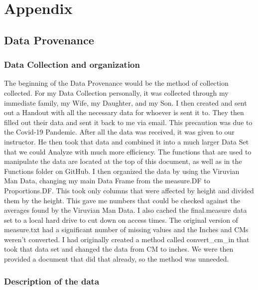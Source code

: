 \documentclass[]{article}
\begin{document}
\section{Appendix}
\subsection{Data Provenance}
\subsubsection{Data Collection and organization}

The beginning of the Data Provenance would be the method of collection
collected. For my Data Collection personally, it was collected through
my immediate family, my Wife, my Daughter, and my Son. I then created
and sent out a Handout with all the necessary data for whoever is sent
it to. They then filled out their data and sent it back to me via email.
This precaution was due to the Covid-19 Pandemic. After all the data was
received, it was given to our instructor. He then took that data and
combined it into a much larger Data Set that we could Analyze with much
more efficiency. The functions that are used to manipulate the data are
located at the top of this document, as well as in the Functions folder
on GitHub. I then organized the data by using the Viruvian Man Data,
changing my main Data Frame from the measure.DF to Proportions.DF. This
took only columns that were affected by height and divided them by the
height. This gave me numbers that could be checked against the averages
found by the Viruvian Man Data. I also cached the final.measure data set
to a local hard drive to cut down on access times. The original version
of measure.txt had a significant number of missing values and the Inches
and CMs weren't converted. I had originally created a method called
convert\_cm\_in that took that data set and changed the data from CM to
inches. We were then provided a document that did that already, so the
method was unneeded.
\label{sec:Provenance- Data collection and Organization}

\subsubsection{Description of the data}
\end{document}
